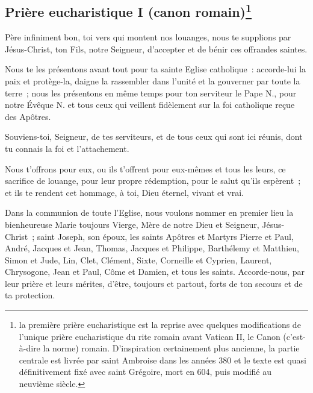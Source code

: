 \subsection{Prière eucharistique I (canon romain)\footnote{la première prière eucharistique est la reprise avec quelques modifications de l'unique 
prière eucharistique du rite romain avant Vatican II, le Canon 
(c'est-à-dire la norme) romain. D'inspiration certainement plus ancienne,
la partie centrale est livrée par saint Ambroise dans les années 380 
et le texte est quasi définitivement fixé avec
saint Grégoire, mort en 604, puis modifié au neuvième siècle.}}\label{pe1} 







Père infiniment bon, toi vers qui montent nos louanges, nous te supplions
par Jésus-Christ, ton Fils, notre Seigneur,  d'accepter et de bénir 
ces offrandes saintes.

Nous te les présentons avant tout pour ta sainte Eglise catholique~:
accorde-lui la paix et protège-la, daigne la rassembler dans l'unité et la
gouverner par toute la terre~; nous les présentons en même temps pour ton
serviteur le Pape N., pour notre Évêque N. et tous ceux
qui veillent fidèlement sur la foi catholique reçue des Apôtres.

Souviens-toi, Seigneur, de tes serviteurs, et de tous 
ceux qui sont ici réunis, dont tu connais la foi et l'attachement. 


Nous t'offrons pour eux, ou ils t'offrent pour eux-mêmes et tous les leurs, ce
sacrifice de louange, pour leur propre rédemption, pour le salut qu'ils
espèrent~; et ils te rendent cet hommage, à toi, Dieu éternel, vivant et
vrai.

Dans la communion de toute l'Eglise, nous voulons nommer en premier lieu la
bienheureuse Marie toujours Vierge, Mère de notre Dieu et Seigneur,
Jésus-Christ~; saint Joseph, son époux, les saints Apôtres et Martyrs Pierre
et Paul, André, Jacques et Jean, Thomas, Jacques et Philippe, Barthélemy et
Matthieu, Simon et Jude, Lin, Clet, Clément, Sixte, Corneille et Cyprien,
Laurent, Chrysogone, Jean et Paul, Côme et Damien, et tous les saints.
Accorde-nous, par leur prière et leurs mérites, d'être, toujours et partout,
forts de ton secours et de ta protection.

